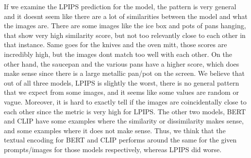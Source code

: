 \documentclass[]{article}
\begin{document}
If we examine the LPIPS prediction for the model, the pattern is very general and it doesnt seem like there are a lot of similarities between the model and what the images are. There are some images like the ice box and pots of pans hanging, that show very high similarity score, but not too relevantly close to each other in that instance. Same goes for the knives and the oven mitt, those scores are incredibly high, but the images dont match too well with each other. On the other hand, the saucepan and the various pans have a higher score, which does make sense since there is a large metallic pan/pot on the screen. We believe that out of all three models, LPIPS is slightly the worst, there is no general pattern that we expect from some images, and it seems like some values are random or vague. Moreover, it is hard to exactly tell if the images are coincidentally close to each other since the metric is very high for LPIPS. The other two models, BERT and CLIP have some examples where the similarity or dissimilarity makes sense, and some examples where it does not make sense. Thus, we think that the textual encoding for BERT and CLIP performs around the same for the given prompts/images for those models respectively, whereas LPIPS did worse.
\end{document}
